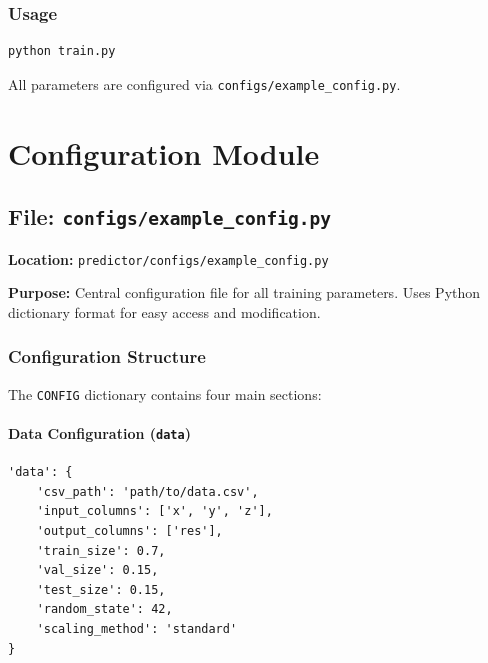 \documentclass[11pt,a4paper]{article}
\begin{document}
\subsubsection{Usage}

\begin{lstlisting}[language=bash]
python train.py
\end{lstlisting}

All parameters are configured via \texttt{configs/example\_config.py}.

\newpage
\section{Configuration Module}

\subsection{File: \texttt{configs/example\_config.py}}

\textbf{Location:} \texttt{predictor/configs/example\_config.py}

\textbf{Purpose:} Central configuration file for all training parameters. Uses Python dictionary format for easy access and modification.

\subsubsection{Configuration Structure}

The \texttt{CONFIG} dictionary contains four main sections:

\paragraph{Data Configuration (\texttt{data})}

\begin{lstlisting}
'data': {
    'csv_path': 'path/to/data.csv',
    'input_columns': ['x', 'y', 'z'],
    'output_columns': ['res'],
    'train_size': 0.7,
    'val_size': 0.15,
    'test_size': 0.15,
    'random_state': 42,
    'scaling_method': 'standard'
}
\end{lstlisting}
\end{document}
